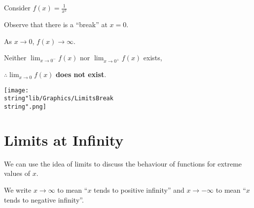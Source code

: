 \documentclass[11pt,a4paper]{book}
\begin{document}
\begin{itemize}
\begin{minipage}[t]{.5\textwidth}
Consider ${\displaystyle f\left(x\right)=\frac{1}{x^{2}}}$

\bigskip

Observe that there is a ``break'' at $x=0$.

\bigskip

As $x\rightarrow0$, $f\left(x\right)\to\infty$.

\bigskip

Neither ${\displaystyle \lim_{x\rightarrow0^{-}}f\left(x\right)}$
nor ${\displaystyle \lim_{x\rightarrow0^{+}}f\left(x\right)}$ exists,

\bigskip

${\displaystyle \therefore\lim_{x\rightarrow0}f\left(x\right)}$
\textbf{does not exist}.

\end{minipage}
\begin{minipage}[t]{.5\textwidth}
\begin{center}
\texttt{[image: \\string"lib/Graphics/LimitsBreak\\string".png]}
\par\end{center}

\end{minipage}

\end{itemize}

\newpage

\section{Limits at Infinity}

We can use the idea of limits to discuss the behaviour of functions
for extreme values of $x$.

We write $x\to\infty$ to mean ``$x$ tends to positive infinity''
and $x\to-\infty$ to mean ``$x$ tends to negative infinity''.
\end{document}
